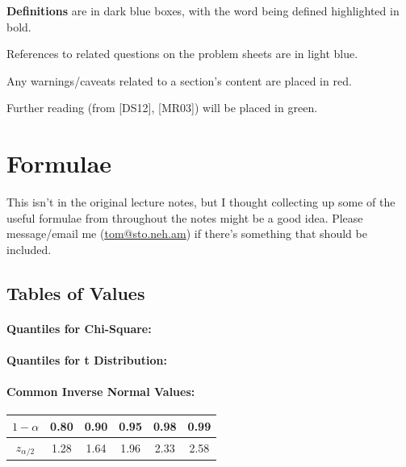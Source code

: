 \documentclass[a4paper]{article}
\begin{document}
        \begin{definition}[Introduction]
            \textbf{Definitions} are in dark blue boxes, with the word being
            defined highlighted in bold.
        \end{definition}

        \begin{relq}
            References to related questions on the problem sheets are in light
            blue.
        \end{relq}

        \begin{warn}
            Any warnings/caveats related to a section's content are placed in
            red.
        \end{warn}

        \begin{fread}
            Further reading (from [DS12], [MR03]) will be placed in green.
        \end{fread}

    \newpage
    \section*{Formulae}
        This isn't in the original lecture notes, but I thought collecting up
        some of the useful formulae from throughout the notes might be a good
        idea. Please message/email me (\href{mailto:tom@sto.neh.am}
        {\underline{tom@sto.neh.am}}) if there's something that should be
        included.

        \subsection*{Tables of Values}
            \paragraph{Quantiles for Chi-Square:}
            

            \paragraph{Quantiles for t Distribution:}
            

            \paragraph{Common Inverse Normal Values:}
                \begin{center}
                    \begin{tabular}{c | c c c c c}
                        $1 - \alpha$ & 0.80 & 0.90 & 0.95 & 0.98 & 0.99 \\
                        \hline
                        $z_{\alpha/2}$ & 1.28 & 1.64 & 1.96 & 2.33 & 2.58
                    \end{tabular}
                \end{center}
\end{document}
